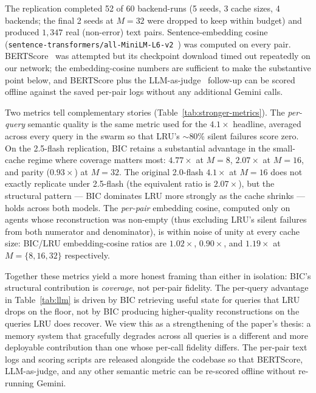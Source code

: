 \documentclass[fleqn,10pt]{article}
\theoremstyle{definition}
\newcommand{\slots}{M}
\begin{document}
The replication completed 52 of 60 backend-runs (5 seeds, 3 cache
sizes, 4 backends; the final 2 seeds at $\slots{=}32$ were dropped
to keep within budget) and produced $1{,}347$ real (non-error) text
pairs. Sentence-embedding cosine
(\texttt{sentence-transformers/all-MiniLM-L6-v2}~\citep{reimers2019sbert})
was computed on every pair. BERTScore~\citep{zhang2020bertscore} was
attempted but its checkpoint download timed out repeatedly on our
network; the embedding-cosine numbers are sufficient to make the
substantive point below, and BERTScore plus the
LLM-as-judge~\citep{zheng2023llmjudge} follow-up can be scored
offline against the saved per-pair logs without any additional
Gemini calls.

Two metrics tell complementary stories
(Table~\ref{tab:stronger-metrics}). The \emph{per-query} semantic
quality is the same metric used for the $4.1\times$ headline,
averaged across every query in the swarm so that LRU's $\sim$80\%
silent failures score zero. On the 2.5-flash replication, BIC retains
a substantial advantage in the small-cache regime where coverage
matters most: $4.77\times$ at $\slots{=}8$, $2.07\times$ at
$\slots{=}16$, and parity ($0.93\times$) at $\slots{=}32$. The
original 2.0-flash $4.1\times$ at $\slots{=}16$ does not exactly
replicate under 2.5-flash (the equivalent ratio is $2.07\times$),
but the structural pattern --- BIC dominates LRU more strongly as
the cache shrinks --- holds across both models. The \emph{per-pair}
embedding cosine, computed only on agents whose reconstruction was
non-empty (thus excluding LRU's silent failures from both numerator
and denominator), is within noise of unity at every cache size:
BIC/LRU embedding-cosine ratios are $1.02\times$, $0.90\times$, and
$1.19\times$ at $\slots{=}\{8, 16, 32\}$ respectively.

Together these metrics yield a more honest framing than either in
isolation: BIC's structural contribution is \emph{coverage}, not
per-pair fidelity. The per-query advantage in Table~\ref{tab:llm} is
driven by BIC retrieving useful state for queries that LRU drops on
the floor, not by BIC producing higher-quality reconstructions on
the queries LRU does recover. We view this as a strengthening of
the paper's thesis: a memory system that gracefully degrades across
all queries is a different and more deployable contribution than one
whose per-call fidelity differs. The per-pair text logs and scoring
scripts are released alongside the codebase so that BERTScore,
LLM-as-judge, and any other semantic metric can be re-scored offline
without re-running Gemini.
\end{document}
